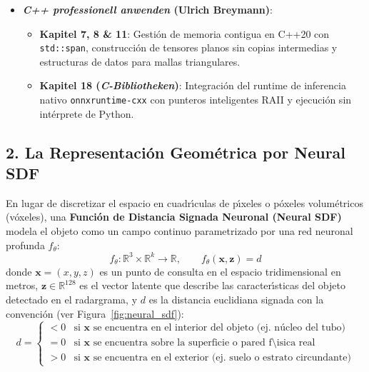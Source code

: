 \documentclass[11pt,a4paper]{article}
\begin{document}
\begin{itemize}
\begin{itemize}
        \item \textbf{Gropp, Yariv, Haim, Atzmon \& Lipman (2020, \textit{Implicit Geometric Regularization for Learning Shapes}, NeurIPS)}: Regularizaci{\'o}n geom{\'e}trica impl{\'\i}cita mediante la condici{\'o}n eikonal $\|\nabla_\mathbf{x} f_\theta(\mathbf{x})\| = 1$.
        \item \textbf{Park, Florence, Straub, Newcombe \& Lovegrove (2019, \textit{DeepSDF: Learning Continuous Signed Distance Functions}, CVPR)}: Representaci{\'o}n continua de formas 3D condicionadas por c{\'o}digos latentes.
    \end{itemize}
    \item \textbf{\textit{C++ professionell anwenden} (Ulrich Breymann)}:
    \begin{itemize}
        \item \textbf{Kapitel 7, 8 \& 11}: Gesti{\'o}n de memoria contigua en C++20 con \texttt{std::span}, construcci{\'o}n de tensores planos sin copias intermedias y estructuras de datos para mallas triangulares.
        \item \textbf{Kapitel 18 (\textit{C-Bibliotheken})}: Integraci{\'o}n del runtime de inferencia nativo \texttt{onnxruntime-cxx} con punteros inteligentes RAII y ejecuci{\'o}n sin int{\'e}rprete de Python.
    \end{itemize}
\end{itemize}

\subsection{2. La Representaci{\'o}n Geom{\'e}trica por Neural SDF}
En lugar de discretizar el espacio en cuadr{\'\i}culas de p{\'\i}xeles o p{\'o}xeles volum{\'e}tricos (v{\'o}xeles), una \textbf{Funci{\'o}n de Distancia Signada Neuronal (Neural SDF)} modela el objeto como un campo continuo parametrizado por una red neuronal profunda $f_\theta$:
\begin{equation}
    f_\theta : \mathbb{R}^3 \times \mathbb{R}^k \to \mathbb{R}, \qquad f_\theta(\mathbf{x}, \mathbf{z}) = d
\end{equation}
donde $\mathbf{x} = (x, y, z)$ es un punto de consulta en el espacio tridimensional en metros, $\mathbf{z} \in \mathbb{R}^{128}$ es el vector latente que describe las caracter{\'\i}sticas del objeto detectado en el radargrama, y $d$ es la distancia euclidiana signada con la convenci{\'o}n (ver Figura~\ref{fig:neural_sdf}):
\begin{equation}
    d = \begin{cases}
        < 0 & \text{si } \mathbf{x} \text{ se encuentra en el interior del objeto (ej. n{\'u}cleo del tubo)} \\
        = 0 & \text{si } \mathbf{x} \text{ se encuentra sobre la superficie o pared f{\'\i}sica real} \\
        > 0 & \text{si } \mathbf{x} \text{ se encuentra en el exterior (ej. suelo o estrato circundante)}
    \end{cases}
\end{equation}
\end{document}
